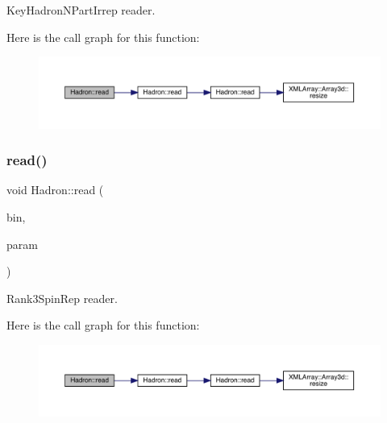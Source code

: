 Key\+Hadron\+N\+Part\+Irrep reader. 

Here is the call graph for this function\+:\nopagebreak
\begin{figure}[H]
\begin{center}
\leavevmode
\includegraphics[width=350pt]{d1/daf/namespaceHadron_a205a666e574892fd5fc22e723a24399e_cgraph}
\end{center}
\end{figure}
\mbox{\label{namespaceHadron_aa7d26a465958f014ffb6f4cb4d45a389}} 
\subsubsection{\texorpdfstring{read()}{read()}\hspace{0.1cm}{\footnotesize\ttfamily [85/94]}}
{\footnotesize\ttfamily void Hadron\+::read (\begin{DoxyParamCaption}\item[{\mbox{\hyperlink{classADATIO_1_1BinaryReader}{Binary\+Reader}} \&}]{bin,  }\item[{\mbox{\hyperlink{structHadron_1_1Rank3SpinRep__t}{Rank3\+Spin\+Rep\+\_\+t}} \&}]{param }\end{DoxyParamCaption})}



Rank3\+Spin\+Rep reader. 

Here is the call graph for this function\+:\nopagebreak
\begin{figure}[H]
\begin{center}
\leavevmode
\includegraphics[width=350pt]{d1/daf/namespaceHadron_aa7d26a465958f014ffb6f4cb4d45a389_cgraph}
\end{center}
\end{figure}
\mbox{\label{namespaceHadron_a0b9e3ade4af9d7765000d9cd6477956e}} 
